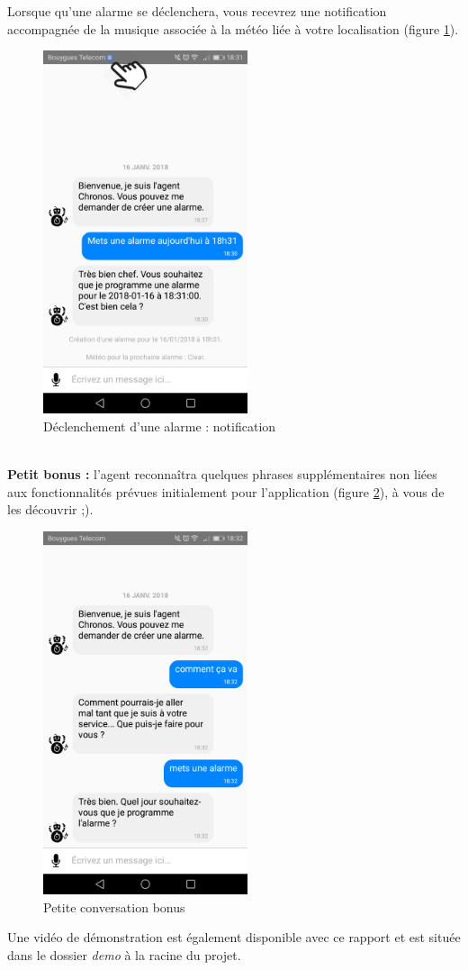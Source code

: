Lorsque qu'une alarme se déclenchera, vous recevrez une notification accompagnée de la musique associée à la météo liée à votre localisation (figure \ref{H}).

\begin{figure}[H]
  \centering
  \includegraphics[width=6cm]{images/H.png}
  \caption{Déclenchement d'une alarme : notification}
  \label{H}
\end{figure}

~\\\indent
\textbf{Petit bonus :} l'agent reconnaîtra quelques phrases supplémentaires non liées aux fonctionnalités prévues initialement pour l'application (figure \ref{J}), à vous de les découvrir \textsf{;)}.

\begin{figure}[H]
  \centering
  \includegraphics[width=6cm]{images/J.png}
  \caption{Petite conversation bonus}
  \label{J}
\end{figure}

Une vidéo de démonstration est également disponible avec ce rapport et est située dans le dossier \emph{demo} à la racine du projet.\\ 